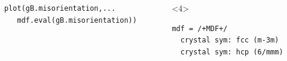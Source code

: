 \documentclass[compress]{beamer}
\begin{document}
\begin{frame}[fragile]
\begin{overlayarea}{\textwidth}{0.61\textheight}
\begin{columns}
\begin{column}{0.6\textwidth}
\pause
      \vspace{-0.3cm}
      \begin{lstlisting}[style=input]
plot(gB.misorientation,...
   mdf.eval(gB.misorientation))
      \end{lstlisting}

      \end{column}
\begin{column}{0.4\textwidth}
  \begin{onlyenv}<4>
    \begin{lstlisting}[style=output]
mdf = /+MDF+/
  crystal sym: fcc (m-3m)
  crystal sym: hcp (6/mmm)


\end{lstlisting}
\end{onlyenv}
\end{column}
\end{columns}
\end{overlayarea}
\end{frame}
\end{document}
